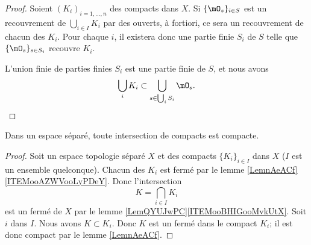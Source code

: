 \begin{proof}
	Soient \( (K_i)_{i=1,\ldots, n}\) des compacts dans \( X\). Si \( \{ \mO_s \}_{i\in S}\) est un recouvrement de \( \bigcup_{i\in I}K_i\) par des ouverts, à fortiori, ce sera un recouvrement de chacun des \( K_i\). Pour chaque \( i\), il existera donc une partie finie \( S_i\) de \( S\) telle que \( \{ \mO_s \}_{s\in S_i}\) recouvre \( K_i\).

	L'union finie de parties finies \( S_i \) est une partie finie de \( S\), et nous avons
	\begin{equation}
		\bigcup_iK_i\subset \bigcup_{s\in \bigcup_iS_i}\mO_s.
	\end{equation}
\end{proof}

\begin{proposition}     \label{PROPooQWHSooXeJOkT}
	Dans un espace séparé, toute intersection de compacts est compacte.
\end{proposition}

\begin{proof}
	Soit un espace topologie séparé \( X\) et des compacts \( \{ K_i \}_{i\in I}\) dans \( X\) (\( I\) est un ensemble quelconque). Chacun des \( K_i\) est fermé par le lemme \ref{LemnAeACf}\ref{ITEMooAZWVooLyPDeY}. Donc l'intersection
	\begin{equation}
		K=\bigcap_{i\in I} K_i
	\end{equation}
	est un fermé de \( X\) par le lemme \ref{LemQYUJwPC}\ref{ITEMooBHIGooMvkUtX}. Soit \( i\) dans \( I\). Nous avons \( K\subset K_i\). Donc \( K\) est un fermé dans le compact \( K_i\); il est donc compact par le lemme \ref{LemnAeACf}.
\end{proof}


